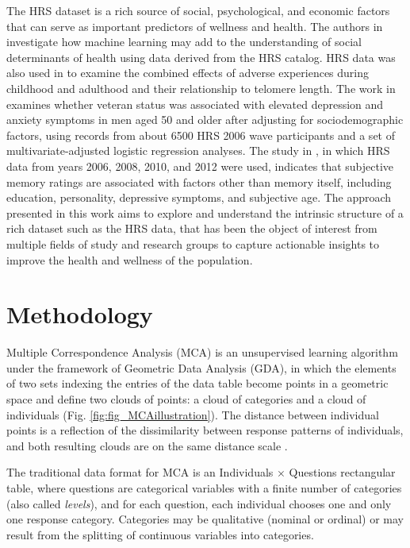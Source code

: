 \documentclass[conference]{IEEEtran}
\begin{document}
The HRS dataset is a rich source of social, psychological, and economic
factors that can serve as important predictors of wellness and health.
The authors in \cite{seligman2018machine} investigate how machine
learning may add to the understanding of social determinants of health
using data derived from the HRS catalog. HRS data was also used in
\cite{puterman2016lifespan} to examine the combined effects of adverse
experiences during childhood and adulthood and their relationship to
telomere length. The work in \cite{christine_nodate} examines whether
veteran status was associated with elevated depression and anxiety
symptoms in men aged 50 and older after adjusting for sociodemographic
factors, using records from about 6500 HRS 2006 wave participants and a
set of multivariate-adjusted logistic regression analyses. The study in
\cite{gizem_nodate}, in which HRS data from years 2006, 2008, 2010, and
2012 were used, indicates that subjective memory ratings are associated
with factors other than memory itself, including education, personality,
depressive symptoms, and subjective age. The approach presented in this
work aims to explore and understand the intrinsic structure of a rich
dataset such as the HRS data, that has been the object of interest from
multiple fields of study and research groups to capture actionable
insights to improve the health and wellness of the population.

\hypertarget{methodology}{%
\section{Methodology}\label{methodology}}

Multiple Correspondence Analysis (MCA) is an unsupervised learning
algorithm under the framework of Geometric Data Analysis (GDA), in which
the elements of two sets indexing the entries of the data table become
points in a geometric space and define two clouds of points: a cloud of
categories and a cloud of individuals (Fig.
\ref{fig:fig_MCAillustration}). The distance between individual points
is a reflection of the dissimilarity between response patterns of
individuals, and both resulting clouds are on the same distance scale
\cite{le2010multiple}.

The traditional data format for MCA is an Individuals \(\times\)
Questions rectangular table, where questions are categorical variables
with a finite number of categories (also called \emph{levels}), and for
each question, each individual chooses one and only one response
category. Categories may be qualitative (nominal or ordinal) or may
result from the splitting of continuous variables into categories.
\end{document}
